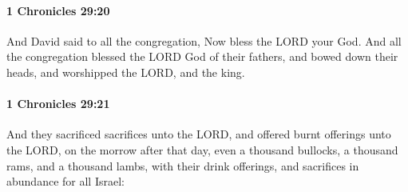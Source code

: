 		\paragraph{1 Chronicles 29:20} %
			\label{1CHRONICLES-29-20}

			And David said to all the congregation, Now bless the LORD your God. And all the congregation blessed the LORD God of their fathers, and bowed down their heads, and worshipped the LORD, and the king.


		\paragraph{1 Chronicles 29:21} %
			\label{1CHRONICLES-29-21}

			And they sacrificed sacrifices unto the LORD, and offered burnt offerings unto the LORD, on the morrow after that day, even a thousand bullocks, a thousand rams, and a thousand lambs, with their drink offerings, and sacrifices in abundance for all Israel:

